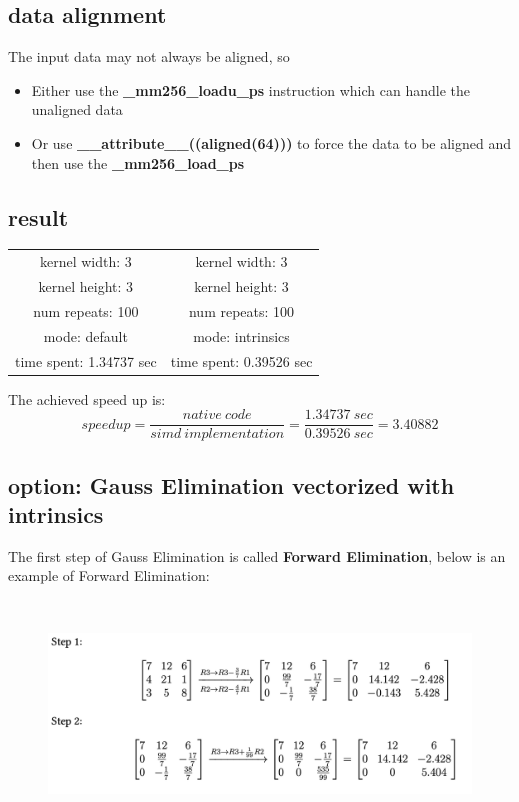 \documentclass[article]{scrartcl}
\begin{document}
\subsection{ data alignment }

The input data may not always be aligned, so
\begin{itemize}
    \item Either use the \textbf{ \_mm256\_loadu\_ps } instruction which can handle the unaligned data
    \item Or use \textbf{\_\_attribute\_\_((aligned(64)))} to force the data to be aligned and then use the \textbf{\_mm256\_load\_ps}
\end{itemize}

\subsection{result}
\begin{center}
\begin{tabular}{ |c|c| } 
 \hline
 kernel width: 3 & kernel width: 3\\ 
 kernel height: 3 &  kernel height: 3\\
 num repeats: 100 & num repeats: 100 \\ 
 mode: default & mode: intrinsics\\
 time spent: 1.34737 sec & time spent: 0.39526 sec\\
 \hline
\end{tabular}
\end{center}
The achieved speed up is:
$$ speedup = \frac{native \ code}{simd \ implementation} = \frac{1.34737 \ sec}{0.39526 \ sec} = 3.40882$$

\subsection{option: Gauss Elimination vectorized with intrinsics}
The first step of Gauss Elimination is called \textbf{Forward Elimination}, below is an example of Forward Elimination:
\begin{figure}[htpb]
    \centering
    \includegraphics[width=\textwidth,height=6cm,keepaspectratio=true]{../figs/Gauss_Elimination.png}
    \label{fig:Gauss_Elimination}
\end{figure}
\end{document}
